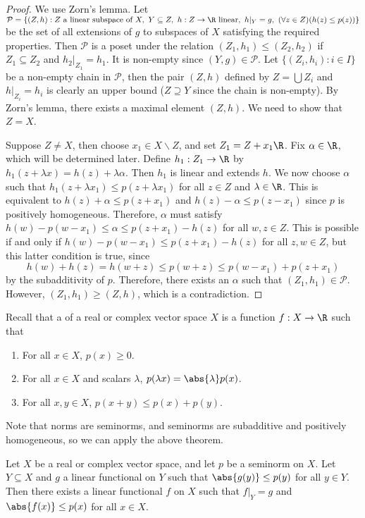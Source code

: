 \documentclass[a4paper]{article}
\begin{document}
\begin{proof}
  We use Zorn's lemma. Let $\mathcal{P}=\{(Z,h):Z\text{ a linear subspace of }X,\ Y\subseteq Z,\ h:Z\to\R\text{ linear},\ h|_Y=g,\ (\forall z\in Z)(h(z)\leq p(z))\}$ be the set of all extensions of $g$ to subspaces of $X$ satisfying the required properties. Then $\mathcal{P}$ is a poset under the relation $(Z_1,h_1)\leq (Z_2,h_2)$ if $Z_1\subseteq Z_2$ and $h_2|_{Z_1}=h_1$. It is non-empty since $(Y,g)\in\mathcal{P}$. Let $\{(Z_i,h_i):i\in I\}$ be a non-empty chain in $\mathcal{P}$, then the pair $(Z,h)$ defined by $Z=\bigcup Z_i$ and $h|_{Z_i}=h_i$ is clearly an upper bound ($Z\supseteq Y$ since the chain is non-empty). By Zorn's lemma, there exists a maximal element $(Z,h)$. We need to show that $Z=X$.

  Suppose $Z\not= X$, then choose $x_1\in X\backslash Z$, and set $Z_1=Z+x_1\R$. Fix $\alpha\in\R$, which will be determined later. Define $h_1:Z_1\to\R$ by $h_1(z+\lambda x)=h(z)+\lambda\alpha$. Then $h_1$ is linear and extends $h$. We now choose $\alpha$ such that $h_1(z+\lambda x_1)\leq p(z+\lambda x_1)$ for all $z\in Z$ and $\lambda\in\R$. This is equivalent to $h(z)+\alpha\leq p(z+x_1)$ and $h(z)-\alpha\leq p(z-x_1)$ since $p$ is positively homogeneous. Therefore, $\alpha$ must satisfy $h(w)-p(w-x_1)\leq\alpha\leq p(z+x_1)-h(z)$ for all $w,z\in Z$. This is possible if and only if $h(w)-p(w-x_1)\leq p(z+x_1)-h(z)$ for all $z,w\in Z$, but this latter condition is true, since
\[h(w)+h(z)=h(w+z)\leq p(w+z)\leq p(w-x_1)+p(z+x_1)\]
by the subadditivity of $p$. Therefore, there exists an $\alpha$ such that $(Z_1,h_1)\in\mathcal{P}$. However, $(Z_1,h_1)\geq (Z,h)$, which is a contradiction.
\end{proof}

Recall that a  of a real or complex vector space $X$ is a function $f:X\to\R$ such that
\begin{enumerate}[label=(\roman*), nosep]
  \item For all $x\in X$, $p(x)\geq 0$.
  \item For all $x\in X$ and scalars $\lambda$, $p(\lambda x)=\abs{\lambda}p(x)$.
  \item For all $x,y\in X$, $p(x+y)\leq p(x)+p(y)$.
\end{enumerate}

Note that norms are seminorms, and seminorms are subadditive and positively homogeneous, so we can apply the above theorem.

\begin{nthm}\label{thm:HahnBanach2}
  Let $X$ be a real or complex vector space, and let $p$ be a seminorm on $X$. Let $Y\subseteq X$ and $g$ a linear functional on $Y$ such that $\abs{g(y)}\leq p(y)$ for all $y\in Y$. Then there exists a linear functional $f$ on $X$ such that $f|_Y=g$ and $\abs{f(x)}\leq p(x)$ for all $x\in X$.
\end{nthm}
\end{document}
